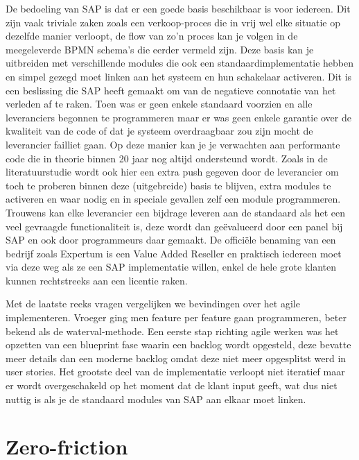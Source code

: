 De bedoeling van SAP is dat er een goede basis beschikbaar is voor iedereen. Dit zijn vaak triviale zaken zoals een verkoop-proces die in vrij wel elke situatie op dezelfde manier verloopt, de flow van zo'n proces kan je volgen in de meegeleverde BPMN schema's die eerder vermeld zijn. Deze basis kan je uitbreiden met verschillende modules die ook een standaardimplementatie hebben en simpel gezegd moet linken aan het systeem en hun schakelaar activeren. Dit is een beslissing die SAP heeft gemaakt om van de negatieve connotatie van het verleden af te raken. Toen was er geen enkele standaard voorzien en alle leveranciers begonnen te programmeren maar er was geen enkele garantie over de kwaliteit van de code of dat je systeem overdraagbaar zou zijn mocht de leverancier failliet gaan. Op deze manier kan je je verwachten aan performante code die in theorie binnen 20 jaar nog altijd ondersteund wordt. Zoals in de literatuurstudie wordt ook hier een extra push gegeven door de leverancier om toch te proberen binnen deze (uitgebreide) basis te blijven, extra modules te activeren en waar nodig en in speciale gevallen zelf een module programmeren. Trouwens kan elke leverancier een bijdrage leveren aan de standaard als het een veel gevraagde functionaliteit is, deze wordt dan geëvalueerd door een panel bij SAP en ook door programmeurs daar gemaakt. De officiële benaming van een bedrijf zoals Expertum is een Value Added Reseller en praktisch iedereen moet via deze weg als ze een SAP implementatie willen, enkel de hele grote klanten kunnen rechtstreeks aan een licentie raken.

Met de laatste reeks vragen vergelijken we bevindingen over het agile implementeren. Vroeger ging men feature per feature gaan programmeren, beter bekend als de waterval-methode. Een eerste stap richting agile werken was het opzetten van een blueprint fase waarin een backlog wordt opgesteld, deze bevatte meer details dan een moderne backlog omdat deze niet meer opgesplitst werd in user stories. Het grootste deel van de implementatie verloopt niet iteratief maar er wordt overgeschakeld op het moment dat de klant input geeft, wat dus niet nuttig is als je de standaard modules van SAP aan elkaar moet linken.


\section{Zero-friction}
